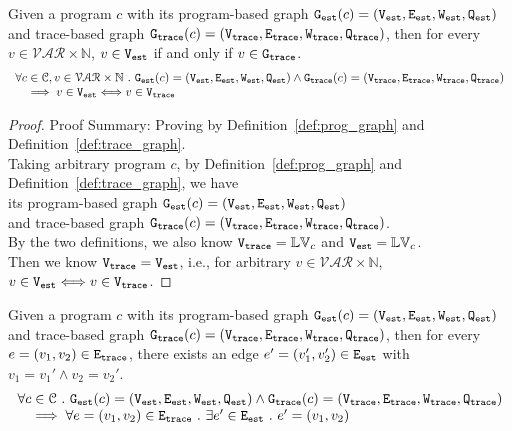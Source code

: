 \begin{lem}
	\label{lem:vertex_map}
	Given a program $c$ with its
	program-based graph $\mathtt{{G_{est}}}({c}) = (\mathtt{{V_{est}}}, \mathtt{{E_{est}}}, \mathtt{{W_{est}}}, \mathtt{{Q_{est}}})$
	and 
	trace-based graph $\mathtt{{G_{trace}}}({c}) = (\mathtt{{V_{trace}}}, \mathtt{{E_{trace}}}, \mathtt{{W_{trace}}}, \mathtt{{Q_{trace}}})$,
	then for every $v \in \mathcal{VAR} \times \mathbb{N}$,
	$v \in \mathtt{{V_{est}}}$ if and only if $v \in \mathtt{{G_{trace}}}$.
	\[
	\begin{array}{l}
	\forall c \in \mathcal{C} , v \in \mathcal{VAR} \times \mathbb{N} ~.~ 
	\mathtt{{G_{est}}}({c}) = (\mathtt{{V_{est}}}, \mathtt{{E_{est}}}, \mathtt{{W_{est}}}, \mathtt{{Q_{est}}})
	\land 
	\mathtt{{G_{trace}}}({c}) = (\mathtt{{V_{trace}}}, \mathtt{{E_{trace}}}, \mathtt{{W_{trace}}}, \mathtt{{Q_{trace}}})
	\\ \quad
	\implies
	v \in \mathtt{{V_{est}}} \Longleftrightarrow v \in \mathtt{{V_{trace}}}
	\end{array}
	\]
	\end{lem}
\begin{proof}
Proof Summary: Proving by Definition~\ref{def:prog_graph} and Definition~\ref{def:trace_graph}.
\\
Taking arbitrary program $c$,
by Definition~\ref{def:prog_graph} and Definition~\ref{def:trace_graph}, 
we have   
\\
its program-based graph $\mathtt{{G_{est}}}({c}) = (\mathtt{{V_{est}}}, \mathtt{{E_{est}}}, \mathtt{{W_{est}}}, \mathtt{{Q_{est}}})$ 
\\
and 
trace-based graph $\mathtt{{G_{trace}}}({c}) = (\mathtt{{V_{trace}}}, \mathtt{{E_{trace}}}, \mathtt{{W_{trace}}}, \mathtt{{Q_{trace}}})$.
\\
By the two definitions, we also know 
$\mathtt{{V_{trace}}}  = \mathbb{LV}_c$ and $\mathtt{{V_{est}}} = \mathbb{LV}_c$.
\\
Then we know $\mathtt{{V_{trace}}}  = \mathtt{{V_{est}}}$, i.e., 
for arbitrary $v \in \mathcal{VAR} \times \mathbb{N}$, $v \in \mathtt{{V_{est}}} \Longleftrightarrow v \in \mathtt{{V_{trace}}}$.
\end{proof}
%
	\begin{lem}
	\label{lem:edge_map}
	Given a program $c$ with its
	program-based graph $\mathtt{{G_{est}}}({c}) = (\mathtt{{V_{est}}}, \mathtt{{E_{est}}}, \mathtt{{W_{est}}}, \mathtt{{Q_{est}}})$
	and 
	trace-based graph $\mathtt{{G_{trace}}}({c}) = (\mathtt{{V_{trace}}}, \mathtt{{E_{trace}}}, \mathtt{{W_{trace}}}, \mathtt{{Q_{trace}}})$,
	then for every $e = (v_1, v_2) \in \mathtt{{E_{trace}}}$, there exists an edge 
	$e' = (v_1', v_2') \in \mathtt{{E_{est}}}$ with 
	$v_1 = v_1' \land v_2 = v_2'$.
	\[
	\begin{array}{l}
	\forall c \in \mathcal{C} ~.~
	 \mathtt{{G_{est}}}({c}) = (\mathtt{{V_{est}}}, \mathtt{{E_{est}}}, \mathtt{{W_{est}}}, \mathtt{{Q_{est}}})
	\land 
	\mathtt{{G_{trace}}}({c}) = (\mathtt{{V_{trace}}}, \mathtt{{E_{trace}}}, \mathtt{{W_{trace}}}, \mathtt{{Q_{trace}}})
	\\ \quad
	\implies
	\forall e = (v_1, v_2) \in \mathtt{{E_{trace}}}
	~.~ 
	\exists e' \in \mathtt{{E_{est}}} ~.~ e' = (v_1, v_2)
	\end{array}
	\]
	\end{lem}
